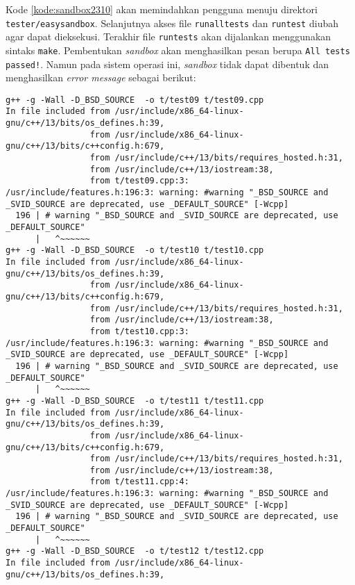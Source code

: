 Kode \ref{kode:sandbox2310} akan memindahkan pengguna menuju direktori \texttt{tester/easysandbox}. Selanjutnya akses file \texttt{runalltests} dan \texttt{runtest} diubah agar dapat dieksekusi. Terakhir file \texttt{runtests} akan dijalankan menggunakan sintaks \texttt{make}. Pembentukan \textit{sandbox} akan menghasilkan pesan berupa \texttt{All tests passed!}. Namun pada sistem operasi ini, \textit{sandbox} tidak dapat dibentuk dan menghasilkan \textit{error message} sebagai berikut:
\begin{lstlisting}[caption=\textit{Error message} pembangunan \textit{sandbox} pada \textit{Ubuntu} 23.10, label=kode:errormsg2310]
g++ -g -Wall -D_BSD_SOURCE  -o t/test09 t/test09.cpp
In file included from /usr/include/x86_64-linux-gnu/c++/13/bits/os_defines.h:39,
                 from /usr/include/x86_64-linux-gnu/c++/13/bits/c++config.h:679,
                 from /usr/include/c++/13/bits/requires_hosted.h:31,
                 from /usr/include/c++/13/iostream:38,
                 from t/test09.cpp:3:
/usr/include/features.h:196:3: warning: #warning "_BSD_SOURCE and _SVID_SOURCE are deprecated, use _DEFAULT_SOURCE" [-Wcpp]
  196 | # warning "_BSD_SOURCE and _SVID_SOURCE are deprecated, use _DEFAULT_SOURCE"
      |   ^~~~~~~
g++ -g -Wall -D_BSD_SOURCE  -o t/test10 t/test10.cpp
In file included from /usr/include/x86_64-linux-gnu/c++/13/bits/os_defines.h:39,
                 from /usr/include/x86_64-linux-gnu/c++/13/bits/c++config.h:679,
                 from /usr/include/c++/13/bits/requires_hosted.h:31,
                 from /usr/include/c++/13/iostream:38,
                 from t/test10.cpp:3:
/usr/include/features.h:196:3: warning: #warning "_BSD_SOURCE and _SVID_SOURCE are deprecated, use _DEFAULT_SOURCE" [-Wcpp]
  196 | # warning "_BSD_SOURCE and _SVID_SOURCE are deprecated, use _DEFAULT_SOURCE"
      |   ^~~~~~~
g++ -g -Wall -D_BSD_SOURCE  -o t/test11 t/test11.cpp
In file included from /usr/include/x86_64-linux-gnu/c++/13/bits/os_defines.h:39,
                 from /usr/include/x86_64-linux-gnu/c++/13/bits/c++config.h:679,
                 from /usr/include/c++/13/bits/requires_hosted.h:31,
                 from /usr/include/c++/13/iostream:38,
                 from t/test11.cpp:4:
/usr/include/features.h:196:3: warning: #warning "_BSD_SOURCE and _SVID_SOURCE are deprecated, use _DEFAULT_SOURCE" [-Wcpp]
  196 | # warning "_BSD_SOURCE and _SVID_SOURCE are deprecated, use _DEFAULT_SOURCE"
      |   ^~~~~~~
g++ -g -Wall -D_BSD_SOURCE  -o t/test12 t/test12.cpp
In file included from /usr/include/x86_64-linux-gnu/c++/13/bits/os_defines.h:39,

\end{lstlisting}
